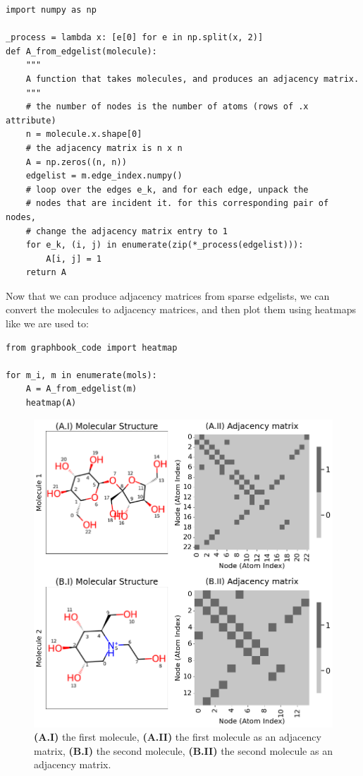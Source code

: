 \begin{lstlisting}[style=python]
import numpy as np

_process = lambda x: [e[0] for e in np.split(x, 2)]
def A_from_edgelist(molecule):
    """
    A function that takes molecules, and produces an adjacency matrix.
    """
    # the number of nodes is the number of atoms (rows of .x attribute)
    n = molecule.x.shape[0]
    # the adjacency matrix is n x n
    A = np.zeros((n, n))
    edgelist = m.edge_index.numpy()
    # loop over the edges e_k, and for each edge, unpack the 
    # nodes that are incident it. for this corresponding pair of nodes, 
    # change the adjacency matrix entry to 1
    for e_k, (i, j) in enumerate(zip(*_process(edgelist))):
        A[i, j] = 1
    return A
\end{lstlisting}

Now that we can produce adjacency matrices from sparse edgelists, we can convert the molecules to adjacency matrices, and then plot them using heatmaps like we are used to:

\begin{lstlisting}[style=python]
from graphbook_code import heatmap

for m_i, m in enumerate(mols):
    A = A_from_edgelist(m)
    heatmap(A)
\end{lstlisting}

\begin{figure}
    \centering
    \includegraphics[width=0.9\linewidth]{next/Images/molecule_ex.png}
    \caption[Example of two molecule adjacency matrices]{\textbf{(A.I)} the first molecule, \textbf{(A.II)} the first molecule as an adjacency matrix, \textbf{(B.I)} the second molecule, \textbf{(B.II)} the second molecule as an adjacency matrix.}
    \label{fig:ch9:gnn:ex}
\end{figure}

